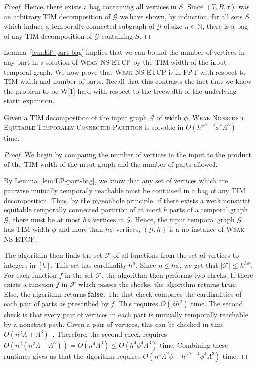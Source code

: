 \documentclass[a4paper,UKenglish,cleveref, autoref, thm-restate]{lipics-v2021} %
\begin{document}
\begin{toappendix}
\begin{proof}
    Hence, there exists a bag containing all vertices in $S$. Since $(T,B,\tau)$ was an arbitrary TIM decomposition of $\mathcal{G}$ we have shown, by induction, for all sets $S$ which induce a temporally connected subgraph of $\mathcal{G}$ of size $n\in \mathbb{N}$, there is a bag of any TIM decomposition of $\mathcal{G}$ containing $S$.
\end{proof}

Lemma~\ref{lem:EP-part-bag} implies that we can bound the number of vertices in any part in a solution of \textsc{Weak NS ETCP} by the TIM width of the input temporal graph. We now prove that \textsc{Weak NS ETCP} is in FPT with respect to TIM width and number of parts. Recall that this contrasts the fact that we know the problem to be W[1]-hard with respect to the treewidth of the underlying static expansion.
\begin{theoremrep}\label{thm:ECP}
    Given a TIM decomposition of the input graph $\mathcal{G}$ of width $\phi$, \textsc{Weak Nonstrict Equitable Temporally Connected Partition} is solvable in $O(h^{\phi h+4}\phi^4\Lambda^3)$ time.
\end{theoremrep}
\begin{proof}
    We begin by comparing the number of vertices in the input to the product of the TIM width of the input graph and the number of parts allowed. 

    By Lemma~\ref{lem:EP-part-bag}, we know that any set of vertices which are pairwise mutually temporally reachable must be contained in a bag of any TIM decomposition. Thus, by the pigeonhole principle, if there exists a weak nonstrict equitable temporally connected partition of at most $h$ parts of a temporal graph $\mathcal{G}$, there must be at most $h\phi$ vertices in $\mathcal{G}$. Hence, the input temporal graph $\mathcal{G}$ has TIM width $\phi$ and more than $h\phi$ vertices, $(\mathcal{G},h)$ is a no-instance of \textsc{Weak NS ETCP}.
    
    The algorithm then finds the set $\mathcal{F}$ of all functions from the set of vertices to integers in $[h]$. This set has cardinality $h^n$. Since $n\leq h\phi$, we get that $|\mathcal{F}|\leq h^{h\phi}$. For each function $f$ in the set $\mathcal{F}$, the algorithm then performs two checks. If there exists a function $f$ in $\mathcal{F}$ which passes the checks, the algorithm returns \textbf{true}. Else, the algorithm returns \textbf{false}.  The first check compares the cardinalities of each pair of parts as prescribed by $f$. This requires $O(\phi h^2)$ time. The second check is that every pair of vertices in each part is mutually temporally reachable by a nonstrict path. Given a pair of vertices, this can be checked in time $O(n^2\Lambda+\Lambda^3)$~\cite{mertzios_temporal_2013}. Therefore, the second check requires $O(n^2(n^2\Lambda+\Lambda^3))=O(n^4\Lambda^3)\leq O(h^4\phi^4\Lambda^3)$ time. Combining these runtimes gives us that the algorithm requires $O(n^4\Lambda^2\phi+h^{\phi h+4}\phi^4\Lambda^3)$ time.


\end{proof}
\end{toappendix}
\end{document}
